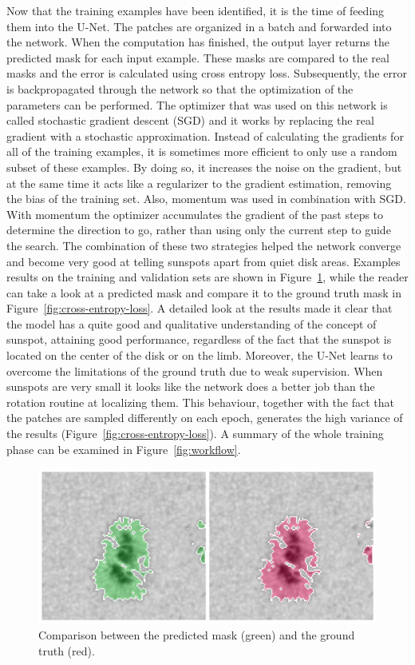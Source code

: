 \bigbreak
\noindent Now that the training examples have been identified, it is the time of feeding them into the U-Net. The patches are organized in a batch and forwarded into the network. When the computation has finished, the output layer returns the predicted mask for each input example. These masks are compared to the real masks and the error is calculated using cross entropy loss. Subsequently, the error is backpropagated through the network so that the optimization of the parameters can be performed. The optimizer that was used on this network is called stochastic gradient descent (SGD) and it works by replacing the real gradient with a stochastic approximation. Instead of calculating the gradients for all of the training examples, it is sometimes more efficient to only use a random subset of these examples. By doing so, it increases the noise on the gradient, but at the same time it acts like a regularizer to the gradient estimation, removing the bias of the training set. Also, momentum was used in combination with SGD. With momentum the optimizer accumulates the gradient of the past steps to determine the direction to go, rather than using only the current step to guide the search. The combination of these two strategies helped the network converge and become very good at telling sunspots apart from quiet disk areas. Examples results on the training and validation sets are shown in Figure~\ref{fig:pred-vs-ground}, while the reader can take a look at a predicted mask and compare it to the ground truth mask in Figure~\ref{fig:cross-entropy-loss}.
\bigbreak
\noindent A detailed look at the results made it clear that the model has a quite good and qualitative understanding of the concept of sunspot, attaining good performance, regardless of the fact that the sunspot is located on the center of the disk or on the limb. Moreover, the U-Net learns to overcome the limitations of the ground truth due to weak supervision. When sunspots are very small it looks like the network does a better job than the rotation routine at localizing them. This behaviour, together with the fact that the patches are sampled differently on each epoch, generates the high variance of the results (Figure~\ref{fig:cross-entropy-loss}). A summary of the whole training phase can be examined in Figure~\ref{fig:workflow}.
\clearpage
\begin{figure}[t!]
    \centering
    \captionsetup{justification=centering}
    \includegraphics[width=\textwidth]{./pictures/pred-vs-ground}
    \caption{Comparison between the predicted mask (green) and the ground truth (red).}
    \label{fig:pred-vs-ground}
\end{figure}

